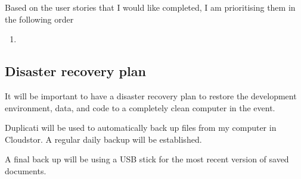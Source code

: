 \documentclass{article}
\begin{document}
Based on the user stories that I would like completed, I am prioritising them in the following order

\begin{enumerate}
    \item 
\end{enumerate}

\subsection*{Disaster recovery plan}

It will be important to have a disaster recovery plan to restore the development environment, data, and code to a completely clean computer in the event.

Duplicati will be used to automatically back up files from my computer in Cloudstor. A regular daily backup will be established.

A final back up will be using a USB stick for the most recent version of saved documents. 
\end{document}
